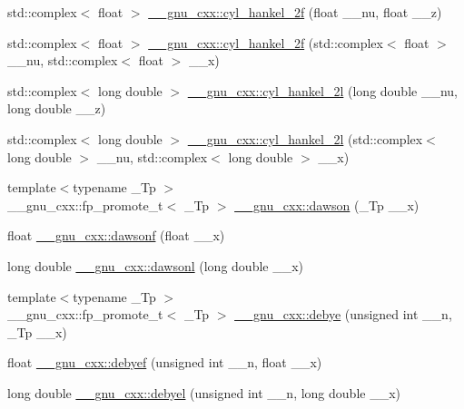 \begin{DoxyCompactItemize}
std\+::complex$<$ float $>$ \hyperlink{group__gnu__math__spec__func_ga2b75361870975c47d57bed71b4064ce7}{\+\_\+\+\_\+gnu\+\_\+cxx\+::cyl\+\_\+hankel\+\_\+2f} (float \+\_\+\+\_\+nu, float \+\_\+\+\_\+z)
\item 
std\+::complex$<$ float $>$ \hyperlink{group__gnu__math__spec__func_gae21f9d09b937eaf9729982da5a382f20}{\+\_\+\+\_\+gnu\+\_\+cxx\+::cyl\+\_\+hankel\+\_\+2f} (std\+::complex$<$ float $>$ \+\_\+\+\_\+nu, std\+::complex$<$ float $>$ \+\_\+\+\_\+x)
\item 
std\+::complex$<$ long double $>$ \hyperlink{group__gnu__math__spec__func_ga4babb91ca6906f237e8bd1f0f1a10509}{\+\_\+\+\_\+gnu\+\_\+cxx\+::cyl\+\_\+hankel\+\_\+2l} (long double \+\_\+\+\_\+nu, long double \+\_\+\+\_\+z)
\item 
std\+::complex$<$ long double $>$ \hyperlink{group__gnu__math__spec__func_ga1ac6434925254bd02e108f5a4e52b34d}{\+\_\+\+\_\+gnu\+\_\+cxx\+::cyl\+\_\+hankel\+\_\+2l} (std\+::complex$<$ long double $>$ \+\_\+\+\_\+nu, std\+::complex$<$ long double $>$ \+\_\+\+\_\+x)
\item 
{\footnotesize template$<$typename \+\_\+\+Tp $>$ }\\\+\_\+\+\_\+gnu\+\_\+cxx\+::fp\+\_\+promote\+\_\+t$<$ \+\_\+\+Tp $>$ \hyperlink{group__gnu__math__spec__func_gabc97cbc04fdd23593e8dccbc1421dad5}{\+\_\+\+\_\+gnu\+\_\+cxx\+::dawson} (\+\_\+\+Tp \+\_\+\+\_\+x)
\item 
float \hyperlink{group__gnu__math__spec__func_ga0a1b8e6760b8c7869127d41d96209318}{\+\_\+\+\_\+gnu\+\_\+cxx\+::dawsonf} (float \+\_\+\+\_\+x)
\item 
long double \hyperlink{group__gnu__math__spec__func_ga6647a7444ff9c7c1f2a8ed36761bfeb2}{\+\_\+\+\_\+gnu\+\_\+cxx\+::dawsonl} (long double \+\_\+\+\_\+x)
\item 
{\footnotesize template$<$typename \+\_\+\+Tp $>$ }\\\+\_\+\+\_\+gnu\+\_\+cxx\+::fp\+\_\+promote\+\_\+t$<$ \+\_\+\+Tp $>$ \hyperlink{group__gnu__math__spec__func_ga0b14de47c011de3ebf771c9f29b2b78c}{\+\_\+\+\_\+gnu\+\_\+cxx\+::debye} (unsigned int \+\_\+\+\_\+n, \+\_\+\+Tp \+\_\+\+\_\+x)
\item 
float \hyperlink{group__gnu__math__spec__func_ga683d3a885913b52db128aa5d624984a4}{\+\_\+\+\_\+gnu\+\_\+cxx\+::debyef} (unsigned int \+\_\+\+\_\+n, float \+\_\+\+\_\+x)
\item 
long double \hyperlink{group__gnu__math__spec__func_ga2db11e767b89bbd36be6ebfadda3401f}{\+\_\+\+\_\+gnu\+\_\+cxx\+::debyel} (unsigned int \+\_\+\+\_\+n, long double \+\_\+\+\_\+x)

\end{DoxyCompactItemize}
